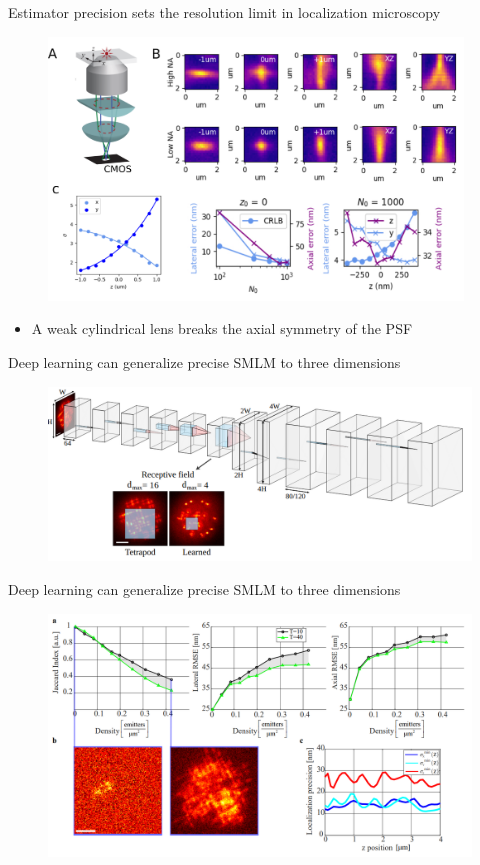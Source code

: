 \documentclass{beamer}					%
\begin{document}
\begin{frame}{Estimator precision sets the resolution limit in localization microscopy}
\begin{figure}
\includegraphics[width=11cm]{Astigmatism.png}
\end{figure}
\begin{itemize}
\item A weak cylindrical lens breaks the axial symmetry of the PSF
\end{itemize}
\end{frame}



\begin{frame}{Deep learning can generalize precise SMLM to three dimensions}
\begin{figure}
\includegraphics[width=13cm]{Architecture.png}
\end{figure}
\end{frame}

\begin{frame}{Deep learning can generalize precise SMLM to three dimensions}
\begin{figure}
\includegraphics[width=12cm]{Jaccard.png}
\end{figure}
\end{frame}
\end{document}
